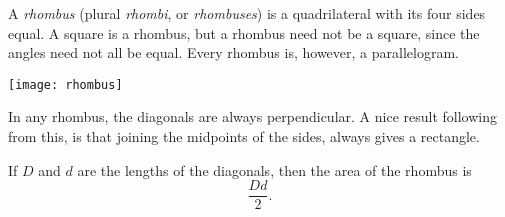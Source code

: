 \documentclass{article}
\begin{document}
A \emph{rhombus} (plural \emph{rhombi}, or \emph{rhombuses})
is a quadrilateral with its four sides equal.
A square is a rhombus,
but a rhombus need not be a square,
since the angles need not all be equal.
Every rhombus is, however, a parallelogram.
\begin{center}
\texttt{[image: rhombus]}
\end{center}
In any rhombus, the diagonals are always perpendicular.
A nice result following from this,
is that joining the midpoints of the sides, always gives a rectangle.

If $D$ and $d$ are the lengths of the diagonals,
then the area of the rhombus is
\[
  \frac{Dd}{2}.
\]
\end{document}
